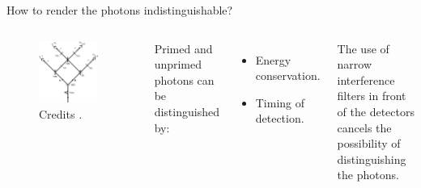 \documentclass[10pt]{beamer}
\begin{document}
\begin{frame}{How to render the photons indistinguishable?}
  \begin{columns}[c]
    \begin{figure}
      \includegraphics[width=0.9\textwidth]{Images/ghz-entanglement'.png}
      \caption{Credits \cite{Nature.403.515}.}
    \end{figure}
    Primed and unprimed photons can be distinguished by:
    \begin{itemize}
    \item Energy conservation.
    \item Timing of detection.
    \end{itemize}
    The use of narrow interference filters in front of the detectors cancels the possibility of distinguishing the photons.
  \end{columns}
\end{frame}
\end{document}
